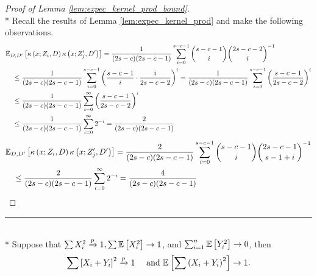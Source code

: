\begin{proof}[Proof of Lemma \ref{lem:expec_kernel_prod_bound}]\mbox{}\\*
    Recall the results of Lemma \ref{lem:expec_kernel_prod} and make the following observations.
    \begin{equation}
        \begin{aligned}
            & \mathbb{E}_{D, D^{\prime}}\left[\kappa\left(x; Z_{i}, D\right)\kappa\left(x; Z_{j}^{\prime}, D^{\prime}\right)\right]
            = \frac{1}{(2s - c)(2s-c-1)}\sum_{i = 0}^{s - c - 1}\binom{s - c - 1}{i}\binom{2s - c - 2}{i}^{-1}\\
            & \quad \leq \frac{1}{(2s - c)(2s-c-1)}\sum_{i = 0}^{s - c - 1}\left(\frac{s - c - 1}{i} \cdot \frac{i}{2s - c - 2}\right)^{i}
            = \frac{1}{(2s - c)(2s-c-1)}\sum_{i = 0}^{s - c - 1}\left(\frac{s - c - 1}{2s - c - 2}\right)^{i}\\
            & \quad \leq \frac{1}{(2s - c)(2s-c-1)}\sum_{i = 0}^{\infty}\left(\frac{s - c - 1}{2s - c - 2}\right)^{i}\\
            & \quad \leq \frac{1}{(2s - c)(2s-c-1)}\sum_{i = 0}^{\infty}2^{-i}
            = \frac{2}{(2s - c)(2s-c-1)}
        \end{aligned}
    \end{equation}
    \begin{equation}
        \begin{aligned}
            & \mathbb{E}_{D, D^{\prime}}\left[\kappa\left(x; Z_{i}, D\right)\kappa\left(x; Z_{j}^{\prime}, D^{\prime}\right)\right]
            = \frac{2}{(2s-c)(2s-c-1)} \sum_{i = 0}^{s-c-1} \binom{s - c - 1}{i}\binom{2s - c - 1}{s-1+i}^{-1}\\
            & \quad \leq \frac{2}{(2s-c)(2s-c-1)} \sum_{i = 0}^{\infty} 2^{-i}
            = \frac{4}{(2s-c)(2s-c-1)}
        \end{aligned}
    \end{equation}
\end{proof}

\hrule

\begin{lem}\label{lem:peng1}\mbox{}\\*
	Suppose that $\sum X_{i}^2 \xrightarrow{p} 1, \sum \mathbb{E}\left[X_{i}^2\right] \rightarrow 1$, and $\sum_{i=1}^n \mathbb{E}\left[Y_{i}^2\right] \rightarrow 0$, then
	\begin{equation}
		\sum\left[X_{i}+Y_{i}\right]^2 \xrightarrow{p} 1 \quad \text { and } \mathbb{E}\left[\sum\left(X_{i}+Y_{i}\right)^2\right] \rightarrow 1.
	\end{equation}
\end{lem}

